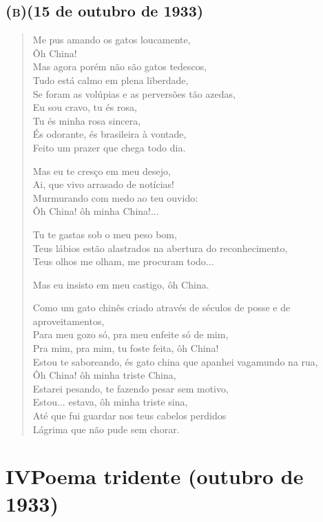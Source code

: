 \medskip

\subsection{\textsc{(b)}\break(15 de outubro de 1933)}


\begin{verse}
Me pus amando os gatos loucamente,\\
Ôh China!\\
Mas agora porém não são gatos tedescos,\\
Tudo está calmo em plena liberdade,\\
Se foram as volúpias e as perversões tão azedas,\\
Eu sou cravo, tu és rosa,\\
Tu és minha rosa sincera,\\
És odorante, és brasileira à vontade,\\
Feito um prazer que chega todo dia.

Mas eu te cresço em meu desejo,\\
Ai, que vivo arrasado de notícias!\\
Murmurando com medo ao teu ouvido:\\
Ôh China! ôh minha China!...

Tu te gastas sob o meu peso bom,\\
Teus lábios estão alastrados na abertura do reconhecimento,\\
Teus olhos me olham, me procuram todo...

Mas eu insisto em meu castigo, ôh China.

Como um gato chinês criado através de séculos de posse e de aproveitamentos,\\
Para meu gozo só, pra meu enfeite só de mim,\\
Pra mim, pra mim, tu foste feita, ôh China!\\
Estou te saboreando, és gato china que apanhei vagamundo na rua,\\
Ôh China! ôh minha triste China,\\
Estarei pesando, te fazendo pesar sem motivo,\\
Estou... estava, ôh minha triste sina,\\
Até que fui guardar nos teus cabelos perdidos\\
Lágrima que não pude sem chorar.
\end{verse}

\pagebreak
{}
\section{IV\break Poema tridente \break (outubro de 1933)}

